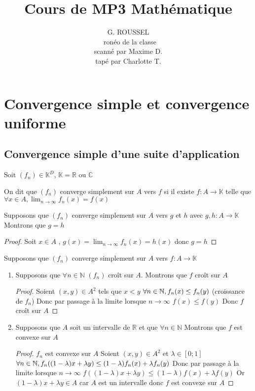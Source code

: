 \documentclass[11pt,hidelinks]{book}
\title{Cours de MP3 Mathématique}
\author{G. ROUSSEL \\ ronéo de la classe \\ scanné par Maxime D. \\ tapé par Charlotte T.}
\theoremstyle{mytheoremstyle}
\theoremstyle{mytheoremstyle}
\theoremstyle{mytheoremstyle}
\theoremstyle{mytheoremstyle}
\theoremstyle{mytheoremstyle}
\theoremstyle{mytheoremstyle}
\theoremstyle{mytheoremstyle}
\theoremstyle{mytheoremstyle}
\theoremstyle{myproblemstyle}
\def\mbb#1{\mathbb{#1}}
\def\bN{\mbb{N}}
\def\bC{\mbb{C}}
\def\bR{\mbb{R}}
\def\bK{\mbb{K}}
\def\ln{\lim_{n \to \infty}}
\newcommand{\func}[3]{#1\colon#2\to#3}
\newcommand{\cvs}[2]{converge simplement sur $#1$ vers $#2$}
\newcommand{\ppln}[1]{par passage à la limite lorsque $n \to \infty$}
\begin{document}
    \maketitle
    \tableofcontents


    \chapter{Convergence simple et convergence uniforme}
    \section{Convergence simple d'une suite d'application}

    Soit $(f_n) \in \bK^{D}$, $\bK = \bR$ ou $\bC$

    \begin{definition}
        On dit que $(f_n)$ \cvs{A}{f} si il existe $\func{f}{A}{\bK}$ telle que $\forall x \in A, \ln f_n(x) = f(x)$
    \end{definition}
    \begin{adjustwidth}{-2em}{-1em}
    \begin{prop}[]
        Supposons que $(f_n)$ \cvs{A}{g} et $h$ avec $\func{g,h}{A}{\bK}$ 
        Montrons que $g=h$
        \begin{proof}
        Soit $x \in A$ , $g(x) = \lim_{n \to \infty} f_n(x) = h(x)$ donc $g=h$
        \end{proof}
    \end{prop}
\end{adjustwidth}
    \begin{adjustwidth}{-2em}{-1em}
    \begin{prop}[]
        Supposons que $(f_n)$ \cvs{A}{\func{f}{A}{\bK}}

        \begin{enumerate}
        \item Supposons que $\forall n \in \bN$ $(f_n)$ croît sur $A$.
        Montrons que $f$ croît sur $A$
        \begin{proof}
        Soient $(x,y) \in A^2$ tels que $x < y$
        $\forall n \in \bN,\space f_n(x) \leq f_n(y)$ (croissance de $f_n$)
        Donc \ppln{} $f(x) \leq f(y)$
        Donc $f$ croît sur $A$
        \end{proof}

        \item Supposons que $A$ soit un intervalle de $\bR$ et que $\forall n \in \bN$
        Montrons que $f$ est convexe sur $A$
        \begin{proof}
        $f_n$ est convexe sur $A$
        Soient $(x,y) \in A^2$ et $\lambda \in [0;1]$
        $\forall n \in \bN,\space f_n((1-\lambda)x + \lambda y) \leq (1-\lambda)f_n(x) + \lambda f_n(y)$ 
        Donc \ppln{} $f((1-\lambda)x + \lambda y) \leq (1-\lambda)f(x) + \lambda f(y)$
        Or $(1-\lambda)x + \lambda y \in A$ car $A$ est un intervalle donc $f$ est convexe sur $A$
        \end{proof}
    \end{enumerate}
    \end{prop}
\end{adjustwidth}
\end{document}
